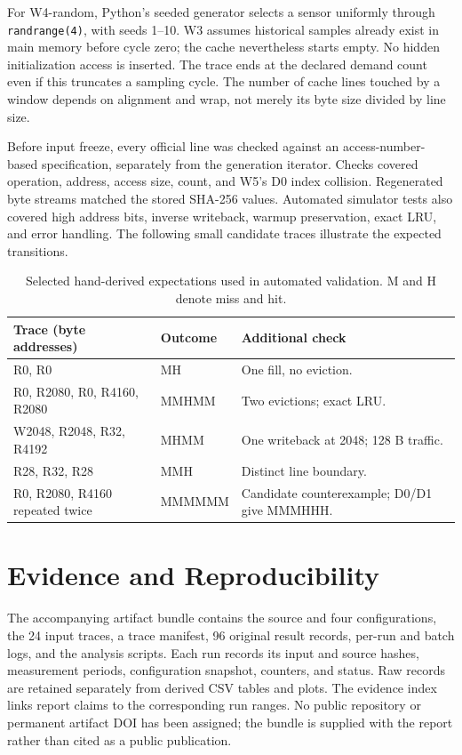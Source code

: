 \documentclass[11pt,a4paper]{article}
\begin{document}
For W4-random, Python's seeded generator selects a sensor uniformly through \texttt{randrange(4)}, with seeds 1--10. W3 assumes historical samples already exist in main memory before cycle zero; the cache nevertheless starts empty. No hidden initialization access is inserted. The trace ends at the declared demand count even if this truncates a sampling cycle. The number of cache lines touched by a window depends on alignment and wrap, not merely its byte size divided by line size.

Before input freeze, every official line was checked against an access-number-based specification, separately from the generation iterator. Checks covered operation, address, access size, count, and W5's D0 index collision. Regenerated byte streams matched the stored SHA-256 values. Automated simulator tests also covered high address bits, inverse writeback, warmup preservation, exact LRU, and error handling. The following small candidate traces illustrate the expected transitions.

\begin{table}[htbp]\centering\small
\caption{Selected hand-derived expectations used in automated validation. M and H denote miss and hit.}
\begin{tabularx}{\linewidth}{Y l Y}\toprule
Trace (byte addresses) & Outcome & Additional check\\\midrule
R0, R0 & MH & One fill, no eviction.\\
R0, R2080, R0, R4160, R2080 & MMHMM & Two evictions; exact LRU.\\
W2048, R2048, R32, R4192 & MHMM & One writeback at 2048; 128 B traffic.\\
R28, R32, R28 & MMH & Distinct line boundary.\\
R0, R2080, R4160 repeated twice & MMMMMM & Candidate counterexample; D0/D1 give MMMHHH.\\\bottomrule
\end{tabularx}
\end{table}

\section{Evidence and Reproducibility}
The accompanying artifact bundle contains the source and four configurations, the 24 input traces, a trace manifest, 96 original result records, per-run and batch logs, and the analysis scripts. Each run records its input and source hashes, measurement periods, configuration snapshot, counters, and status. Raw records are retained separately from derived CSV tables and plots. The evidence index links report claims to the corresponding run ranges. No public repository or permanent artifact DOI has been assigned; the bundle is supplied with the report rather than cited as a public publication.
\end{document}
